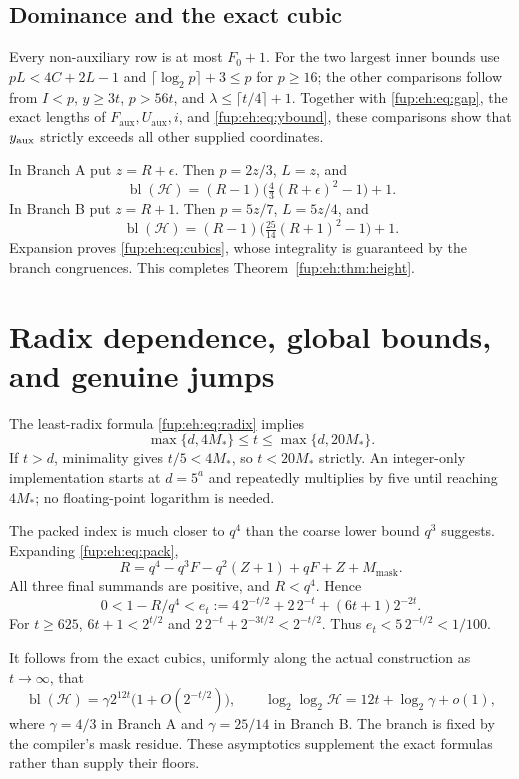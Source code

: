 \documentclass[11pt,letterpaper]{article}
\theoremstyle{definition}\newtheorem{definition}[theorem]{Definition}
\theoremstyle{remark}\newtheorem{remark}[theorem]{Remark}
\newcommand{\Fa}{F_{\mathrm{aux}}}\newcommand{\Ua}{U_{\mathrm{aux}}}\newcommand{\ttt}{t_{\mathrm{tr}}}
\newcommand{\bl}{\operatorname{bl}}
\begin{document}
\subsection{Dominance and the exact cubic}
Every non-auxiliary row is at most $F_0+1$. For the two largest
inner bounds use $pL<4C+2L-1$ and
$\lceil\log_2p\rceil+3\le p$ for $p\ge16$; the other
comparisons follow from $I<p$, $y\ge3t$, $p>56t$, and
$\lambda\le\lceil t/4\rceil+1$.
Together with \eqref{fup:eh:eq:gap}, the exact lengths of $\Fa,\Ua,i$,
and \eqref{fup:eh:eq:ybound}, these comparisons show that $y_{\mathrm{aux}}$ strictly
exceeds all other supplied coordinates.

In Branch A put $z=R+\epsilon$. Then $p=2z/3$, $L=z$, and
\[
 \bl(\mathcal H)=(R-1)\bigl(\tfrac43(R+\epsilon)^2-1\bigr)+1.
\]
In Branch B put $z=R+1$. Then $p=5z/7$, $L=5z/4$, and
\[
 \bl(\mathcal H)=(R-1)\bigl(\tfrac{25}{14}(R+1)^2-1\bigr)+1.
\]
Expansion proves \eqref{fup:eh:eq:cubics}, whose integrality is guaranteed by
the branch congruences. This completes Theorem~\ref{fup:eh:thm:height}.

\section{Radix dependence, global bounds, and genuine jumps}
\label{fup:eh:sec:global}
The least-radix formula \eqref{fup:eh:eq:radix} implies
\begin{equation}\label{fup:eh:eq:radixenvelope}
 \max\{d,4M_*\}\le t\le\max\{d,20M_*\}.
\end{equation}
If $t>d$, minimality gives $t/5<4M_*$, so $t<20M_*$ strictly.
An integer-only implementation starts at $d=5^a$ and repeatedly
multiplies by five until reaching $4M_*$; no floating-point logarithm
is needed.

The packed index is much closer to $q^4$ than the coarse lower
bound $q^3$ suggests. Expanding \eqref{fup:eh:eq:pack},
\[
 R=q^4-q^3F-q^2(Z+1)+qF+Z+M_{\mathrm{mask}}.
\]
All three final summands are positive, and $R<q^4$. Hence
\begin{equation}\label{fup:eh:eq:theta}
 0<1-R/q^4< e_t:=4\,2^{-t/2}+2\,2^{-t}+(6t+1)2^{-2t}.
\end{equation}
For $t\ge625$, $6t+1<2^{t/2}$ and
$2\,2^{-t}+2^{-3t/2}<2^{-t/2}$. Thus
$e_t<5\,2^{-t/2}<1/100$.

It follows from the exact cubics, uniformly along the actual
construction as $t\to\infty$, that
\begin{equation}\label{fup:eh:eq:asymptotic}
 \bl(\mathcal H)=\gamma 2^{12t}\bigl(1+O(2^{-t/2})\bigr),\qquad
 \log_2\log_2\mathcal H=12t+\log_2\gamma+o(1),
\end{equation}
where $\gamma=4/3$ in Branch A and $\gamma=25/14$ in Branch B.
The branch is fixed by the compiler's mask residue. These asymptotics
supplement the exact formulas rather than supply their floors.
\end{document}
